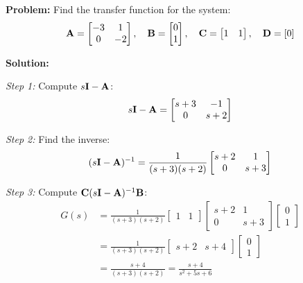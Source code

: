 \textbf{Problem:} Find the transfer function for the system:
\begin{equation}
    \mathbf{A} = \begin{bmatrix} -3 & 1 \\ 0 & -2 \end{bmatrix}, \quad
    \mathbf{B} = \begin{bmatrix} 0 \\ 1 \end{bmatrix}, \quad
    \mathbf{C} = \begin{bmatrix} 1 & 1 \end{bmatrix}, \quad
    \mathbf{D} = [0]
\end{equation}

\textbf{Solution:}

\textit{Step 1:} Compute $s\mathbf{I} - \mathbf{A}$:
\begin{equation}
    s\mathbf{I} - \mathbf{A} = \begin{bmatrix} s+3 & -1 \\ 0 & s+2 \end{bmatrix}
\end{equation}

\textit{Step 2:} Find the inverse:
\begin{equation}
    (s\mathbf{I} - \mathbf{A})^{-1} = \frac{1}{(s+3)(s+2)} \begin{bmatrix} s+2 & 1 \\ 0 & s+3 \end{bmatrix}
\end{equation}

\textit{Step 3:} Compute $\mathbf{C}(s\mathbf{I}-\mathbf{A})^{-1}\mathbf{B}$:
\begin{align}
    G(s) &= \frac{1}{(s+3)(s+2)} \begin{bmatrix} 1 & 1 \end{bmatrix}
    \begin{bmatrix} s+2 & 1 \\ 0 & s+3 \end{bmatrix}
    \begin{bmatrix} 0 \\ 1 \end{bmatrix} \\
    &= \frac{1}{(s+3)(s+2)} \begin{bmatrix} s+2 & s+4 \end{bmatrix}
    \begin{bmatrix} 0 \\ 1 \end{bmatrix} \\
    &= \frac{s+4}{(s+3)(s+2)} = \frac{s+4}{s^2+5s+6}
\end{align}

